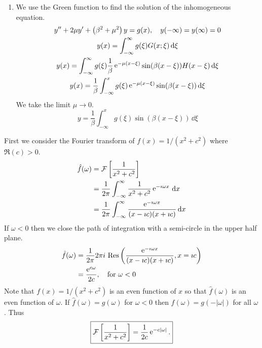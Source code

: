 {\begin{Solution}
\begin{enumerate}
\begin{gather*}
      G(x;\xi) = \frac{1}{\beta} \e^{- \mu(x - \xi)} \sin(\beta (x - \xi)).
    \end{gather*}
    Thus the Green function is 
    \[
    \boxed{
      G(x;\xi) = \frac{1}{\beta} \e^{- \mu(x - \xi)} \sin(\beta (x - \xi)) H(x - \xi).
      }
    \]
  \item
    We use the Green function to find the solution of the 
    inhomogeneous equation.
    \begin{gather*}
      y'' + 2 \mu y' + \left( \beta^2 + \mu^2 \right) y = g(x), \quad y(-\infty) = y(\infty) = 0
      \\
      y(x) = \int_{-\infty}^\infty g(\xi) G(x;\xi) \,\mathrm{d} \xi 
      \\
      y(x) = \int_{-\infty}^\infty g(\xi) \frac{1}{\beta} \mathop{\mathrm{e}}\nolimits^{- \mu(x - \xi)} \sin(\beta (x - \xi)) H(x - \xi)\,\mathrm{d} \xi 
      \\
      y(x) = \frac{1}{\beta} \int_{-\infty}^x g(\xi) \mathop{\mathrm{e}}\nolimits^{- \mu(x - \xi)} \sin(\beta (x - \xi)) \,\mathrm{d} \xi
    \end{gather*}
    We take the limit $\mu \to 0$.
    \[
    \boxed{
      y = \frac{1}{\beta} \int_{-\infty}^x g(\xi) \sin(\beta (x - \xi))\,\dd \xi
      }
    \]
  \end{enumerate}
\end{Solution}










\begin{Solution}
  \label{solution ode ft int eqn u/xxi2+a2}
  First we consider the Fourier transform of $f(x) = 1/(x^2 + c^2)$ where 
  $\Re(c) > 0$.
  \begin{align*}
    \hat{f}(\omega)
    &= \mathcal{F}\left[ \frac{1}{x^2+c^2} \right] \\
    &= \frac{1}{2\pi} \int_{-\infty}^\infty \frac{1}{x^2+c^2} \mathop{\mathrm{e}}\nolimits^{-\imath \omega x}\,\mathrm{d} x \\
    &= \frac{1}{2\pi} \int_{-\infty}^\infty \frac{\mathop{\mathrm{e}}\nolimits^{-\imath \omega x}}{(x-\imath c)(x+\imath c)}\,\mathrm{d} x
  \end{align*}
  If $\omega < 0$ then we close the path of integration with a semi-circle in the
  upper half plane.
  \begin{align*}
    \hat{f}(\omega)
    &= \frac{1}{2\pi} 2 \pi i\, \mathop{\mathrm{Res}}\nolimits \left( 
      \frac{\mathop{\mathrm{e}}\nolimits^{-\imath \omega x}}{(x-\imath c)(x+\imath c)}, x = \imath c \right) \\
    &= \frac{\mathop{\mathrm{e}}\nolimits^{c \omega}}{2 c}, \quad \mathrm{for}\ \omega < 0
  \end{align*}
  Note that $f(x) = 1/(x^2 + c^2)$ is an even function of $x$ so that 
  $\hat{f}(\omega)$ is an even function of $\omega$.  If 
  $\hat{f}(\omega) = g(\omega)$ for $\omega < 0$ then 
  $f(\omega) = g(-|\omega|)$ for all $\omega$.  Thus
  \[
  \boxed{
    \mathcal{F}\left[ \frac{1}{x^2+c^2} \right] = \frac{1}{2 c} \mathop{\mathrm{e}}\nolimits^{- c |\omega|}.
    }
  \]


\end{Solution}}
